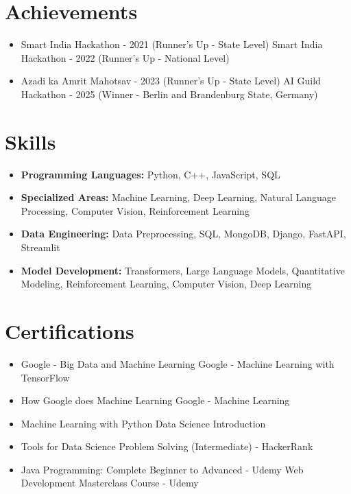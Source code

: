\documentclass[a4paper,10pt]{article}
\begin{document}
\section*{Achievements}
\begin{itemize}
\item Smart India Hackathon - 2021 (Runner's Up - State Level) \hfill Smart India Hackathon - 2022 (Runner's Up - National Level)
\item Azadi ka Amrit Mahotsav - 2023 (Runner's Up - State Level) \hfill AI Guild Hackathon - 2025 (Winner - Berlin and Brandenburg State, Germany)
\end{itemize}

\section*{Skills}
\begin{itemize}
  \item \textbf{Programming Languages:} Python, C++, JavaScript, SQL
  \item \textbf{Specialized Areas:} Machine Learning, Deep Learning, Natural Language Processing, Computer Vision, Reinforcement Learning
  \item \textbf{Data Engineering:} Data Preprocessing, SQL, MongoDB, Django, FastAPI, Streamlit
  \item \textbf{Model Development:} Transformers, Large Language Models, Quantitative Modeling, Reinforcement Learning, Computer Vision, Deep Learning
\end{itemize}

\section*{Certifications}
\begin{itemize}
\item Google - Big Data and Machine Learning \hfill Google - Machine Learning with TensorFlow
\item How Google does Machine Learning \hfill Google - Machine Learning
\item Machine Learning with Python \hfill Data Science Introduction
\item Tools for Data Science \hfill Problem Solving (Intermediate) - HackerRank
\item Java Programming: Complete Beginner to Advanced - Udemy \hfill Web Development Masterclass Course - Udemy
\end{itemize}
\end{document}
